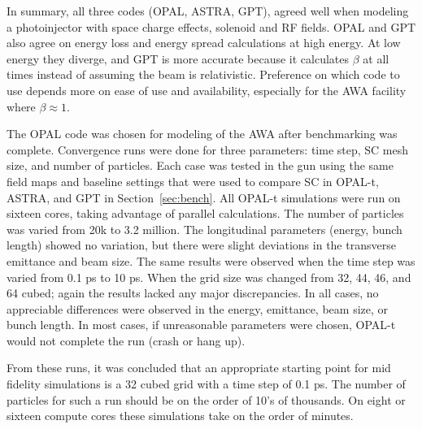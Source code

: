 In summary, all three codes (OPAL, ASTRA, GPT), agreed well when modeling a photoinjector
with space charge effects, solenoid and RF fields.
OPAL and GPT also agree on energy loss and energy spread calculations at high energy.
At low energy they diverge, and GPT is more accurate because it calculates 
$\beta$ at all times instead of assuming the beam is relativistic.
Preference on which code to use depends more on ease of use 
and availability, especially for the AWA facility where $\beta\approx 1$. 


The OPAL code was chosen for modeling of the AWA after benchmarking was complete.
Convergence runs were done for three parameters: 
time step, SC mesh size, and number of particles.  
Each case was tested in the gun using the same field maps and 
baseline settings that were used to compare SC in OPAL-t,  
ASTRA, and GPT in Section~\ref{sec:bench}. 
All OPAL-t simulations were run on 
sixteen cores, taking advantage of parallel calculations. 
The number of particles was varied from 20k to 3.2 million.  
The longitudinal parameters (energy,  bunch length)  
showed no variation, but there were slight deviations 
in the transverse emittance and beam size. The same results 
were observed when the time step was varied from 0.1 ps  to  10  ps.  
When the grid size was changed from 32, 44, 46, and 64 cubed; 
again the results lacked any major discrepancies.  
In all cases, no appreciable differences were observed in the energy,
emittance, beam size, or bunch length. In  most  cases,  
if unreasonable  parameters  were chosen, 
OPAL-t would not complete the run (crash or hang up).  

From these runs, it was concluded that an appropriate starting point 
for mid fidelity simulations is a 32 cubed grid with a time step
of 0.1 ps. The number of particles for such a run should be on the
order of 10's of thousands. On eight or sixteen compute cores
these simulations take on the order of minutes.


